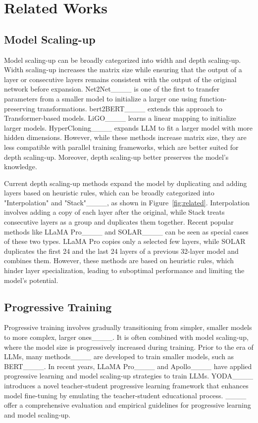 \section{Related Works}
\subsection{Model Scaling-up}
Model scaling-up can be broadly categorized into width and depth scaling-up. Width scaling-up increases the matrix size while ensuring that the output of a layer or consecutive layers remains consistent with the output of the original network before expansion. Net2Net____ is one of the first to transfer parameters from a smaller model to initialize a larger one using function-preserving transformations. bert2BERT____ extends this approach to Transformer-based models. LiGO____ learns a linear mapping to initialize larger models. HyperCloning____ expands LLM to fit a larger model with more hidden dimensions. However, while these methods increase matrix size, they are less compatible with parallel training frameworks, which are better suited for depth scaling-up. Moreover, depth scaling-up better preserves the model's knowledge.


Current depth scaling-up methods expand the model by duplicating and adding layers based on heuristic rules, which can be broadly categorized into "Interpolation" and "Stack"____, as shown in Figure~\ref{fig:related}. Interpolation involves adding a copy of each layer after the original, while Stack treats consecutive layers as a group and duplicates them together. Recent popular methods like LLaMA Pro____ and SOLAR____ can be seen as special cases of these two types. LLaMA Pro copies only a selected few layers, while SOLAR duplicates the first 24 and the last 24 layers of a previous 32-layer model and combines them. However, these methods are based on heuristic rules, which hinder layer specialization, leading to suboptimal performance and limiting the model's potential.

\subsection{Progressive Training}
Progressive training involves gradually transitioning from simpler, smaller models to more complex, larger ones____. It is often combined with model scaling-up, where the model size is progressively increased during training. Prior to the era of LLMs, many methods____ are developed to train smaller models, such as BERT____. In recent years, LLaMA Pro____ and Apollo____ have applied progressive learning and model scaling-up strategies to train LLMs. YODA____ introduces a novel teacher-student progressive learning framework that enhances model fine-tuning by emulating the teacher-student educational process. ____ offer a comprehensive evaluation and empirical guidelines for progressive learning and model scaling-up.